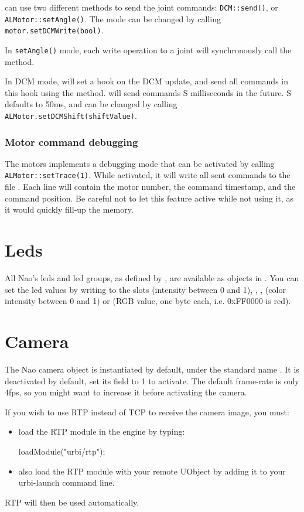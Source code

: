 \urbi can use two different methods to send the joint commands:
\lstinline|DCM::send()|, or \lstinline|ALMotor::setAngle()|.
The mode can be changed by calling \lstinline|motor.setDCMWrite(bool)|.

In \lstinline|setAngle()| mode, each write operation to a joint will
synchronously call the  \naoqi method.

In DCM mode, \urbi will set a hook on the DCM update, and send all
commands in this hook using the  method.  \urbi will
send commands S milliseconds in the future. S defaults to 50ms, and
can be changed by calling \lstinline|ALMotor.setDCMShift(shiftValue)|.

\subsubsection{Motor command debugging}

The motors implements a debugging mode that can be activated by
calling \lstinline|ALMotor::setTrace(1)|. While activated, it will
write all sent commands to the file . Each line will
contain the motor number, the command timestamp, and the command
position.  Be careful not to let this feature active while not using
it, as it would quickly fill-up the memory.

\section{Leds}

All Nao's leds and led groups, as defined by \naoqi, are available as
objects in \us. You can set the led values by writing to the slots
 (intensity between 0 and 1), , , 
(color intensity between 0 and 1) or  (RGB value, one byte
each, i.e. 0xFF0000 is red).

\section{Camera}

The Nao camera object is instantiated by default, under the standard name
. It is deactivated by default, set its  field to 1 to
activate. The default frame-rate is only 4fps, so you might want to increase it
before activating the camera.

If you wish to use RTP instead of TCP to receive the camera image, you must:
\begin{itemize}
\item load the RTP module in the engine by typing:
\begin{urbiunchecked}
loadModule("urbi/rtp");
\end{urbiunchecked}
\item also load the RTP module with your remote UObject by adding it to your
urbi-launch command line.
\end{itemize}
RTP will then be used automatically.

